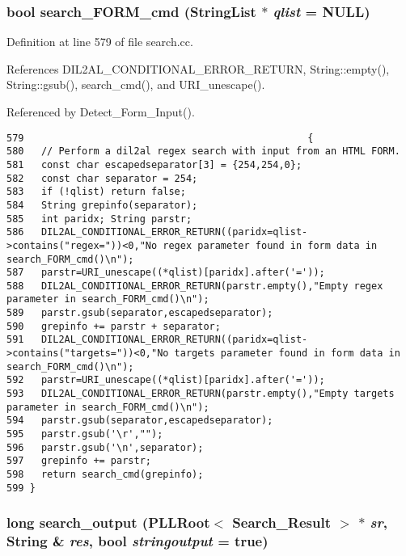 \subsubsection{\setlength{\rightskip}{0pt plus 5cm}bool search\_\-FORM\_\-cmd ({\bf String\-List} $\ast$ {\em qlist} = NULL)}\label{search_8cc_a6}




Definition at line 579 of file search.cc.

References DIL2AL\_\-CONDITIONAL\_\-ERROR\_\-RETURN, String::empty(), String::gsub(), search\_\-cmd(), and URI\_\-unescape().

Referenced by Detect\_\-Form\_\-Input().



\footnotesize\begin{verbatim}579                                                 {
580   // Perform a dil2al regex search with input from an HTML FORM.
581   const char escapedseparator[3] = {254,254,0};
582   const char separator = 254;
583   if (!qlist) return false;
584   String grepinfo(separator);
585   int paridx; String parstr;
586   DIL2AL_CONDITIONAL_ERROR_RETURN((paridx=qlist->contains("regex="))<0,"No regex parameter found in form data in search_FORM_cmd()\n");
587   parstr=URI_unescape((*qlist)[paridx].after('='));
588   DIL2AL_CONDITIONAL_ERROR_RETURN(parstr.empty(),"Empty regex parameter in search_FORM_cmd()\n");
589   parstr.gsub(separator,escapedseparator);
590   grepinfo += parstr + separator;
591   DIL2AL_CONDITIONAL_ERROR_RETURN((paridx=qlist->contains("targets="))<0,"No targets parameter found in form data in search_FORM_cmd()\n");
592   parstr=URI_unescape((*qlist)[paridx].after('='));
593   DIL2AL_CONDITIONAL_ERROR_RETURN(parstr.empty(),"Empty targets parameter in search_FORM_cmd()\n");
594   parstr.gsub(separator,escapedseparator);
595   parstr.gsub('\r',"");
596   parstr.gsub('\n',separator);
597   grepinfo += parstr;
598   return search_cmd(grepinfo);
599 }
\end{verbatim}\normalsize 
{}
\subsubsection{\setlength{\rightskip}{0pt plus 5cm}long search\_\-output ({\bf PLLRoot}$<$ {\bf Search\_\-Result} $>$ $\ast$ {\em sr}, {\bf String} \& {\em res}, bool {\em stringoutput} = {\bf true})}\label{search_8cc_a1}





